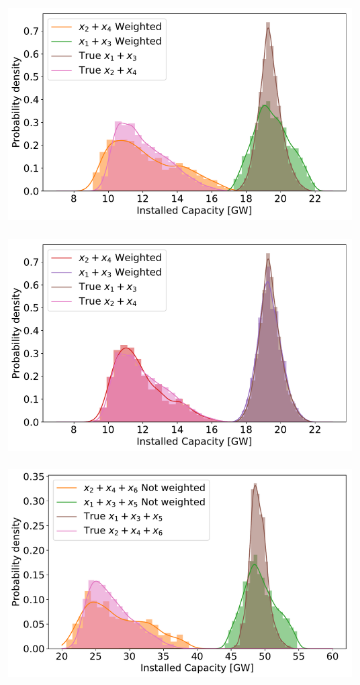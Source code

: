 \begin{figure}[hb]\centering
	\begin{subfigure}{.5\textwidth}
		\centering
		\includegraphics[width=1.\textwidth]{./Images/multi_4D_1}
		\caption{}
		\label{fig:multi_4D_1}
	\end{subfigure}%
	\begin{subfigure}{.5\textwidth}
		\centering
		\includegraphics[width=1.\textwidth]{./Images/multi_4D_2}
		\caption{}
		\label{fig:multi_4D_2}
	\end{subfigure}
	\vspace{10pt}
	\begin{subfigure}{.5\textwidth}
		\centering
		\includegraphics[width=1.\textwidth]{./Images/multi_6D_1}

\end{subfigure}
\end{figure}
